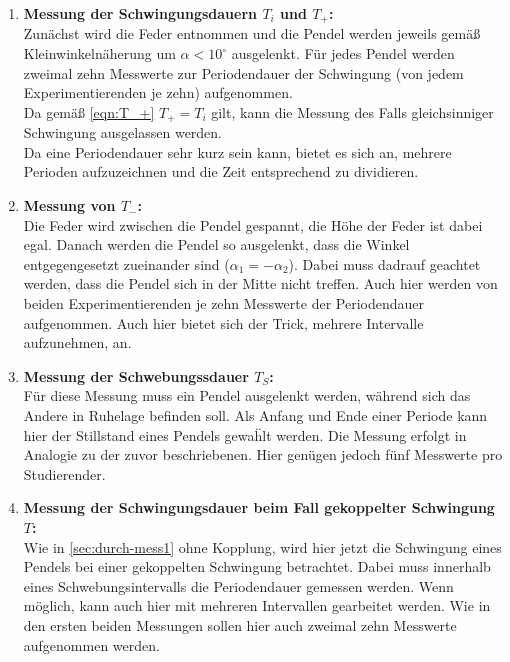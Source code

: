 \begin{enumerate}
	\item \textbf{Messung der Schwingungsdauern $T_i$ und $T_+$:} \\
		Zunächst wird die Feder entnommen und die Pendel werden jeweils gemäß
		Kleinwinkelnäherung um $\alpha < 10^\circ$ ausgelenkt. Für jedes
		Pendel werden zweimal zehn Messwerte zur Periodendauer der Schwingung
		(von jedem Experimentierenden je zehn) aufgenommen. \\
		Da gemäß \autoref{eqn:T_+} $T_+ = T_i$ gilt, kann die Messung des Falls
		gleichsinniger Schwingung ausgelassen werden. \\
		Da eine Periodendauer sehr kurz sein kann, bietet es sich an, mehrere
		Perioden aufzuzeichnen und die Zeit entsprechend zu dividieren.
		\label{sec:durch-mess1}
	\item \textbf{Messung von $T_-$:} \\
		Die Feder wird zwischen die Pendel gespannt, die Höhe der Feder ist dabei
		egal. Danach werden die Pendel so ausgelenkt, dass die Winkel 
		entgegengesetzt zueinander sind ($\alpha_1 = -\alpha_2$). Dabei muss
		dadrauf geachtet werden, dass die Pendel sich in der Mitte nicht treffen.
		Auch hier werden von beiden Experimentierenden je zehn Messwerte der
		Periodendauer aufgenommen. Auch hier bietet sich der Trick, mehrere
		Intervalle aufzunehmen, an.
	\item \textbf{Messung der Schwebungssdauer $T_S$:} \\
		Für diese Messung muss ein Pendel ausgelenkt werden, während sich das
		Andere in Ruhelage befinden soll. Als Anfang und Ende einer Periode 
		kann hier der Stillstand eines Pendels gewaḧlt werden. Die Messung erfolgt
		in Analogie zu der zuvor beschriebenen. Hier genügen jedoch fünf Messwerte
		pro Studierender.
	\item \textbf{Messung der Schwingungsdauer beim Fall gekoppelter Schwingung $T$:} \\
		Wie in \autoref{sec:durch-mess1} ohne Kopplung, wird hier jetzt die
		Schwingung eines Pendels bei einer gekoppelten Schwingung betrachtet.
		Dabei muss innerhalb eines Schwebungsintervalls die Periodendauer gemessen
		werden. Wenn möglich, kann auch hier mit mehreren Intervallen gearbeitet
		werden. Wie in den ersten beiden Messungen sollen hier auch zweimal zehn
		Messwerte aufgenommen werden.
\end{enumerate}

